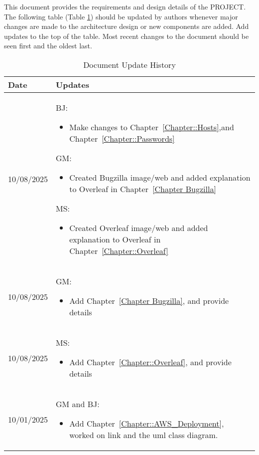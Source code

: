 This document provides the requirements and design details of the
PROJECT.  The following table (Table \ref{Table::UpdateHistory}) should be
updated by authors whenever major changes are made to the architecture
design or new components are added. Add updates to the top of the table.  
Most recent changes to the document should be seen first and the oldest 
last.

\begin{longtable}{|l||p{13.5cm}|}
\caption{Document Update History \label{Table::UpdateHistory}}\\
\hline
\textbf{Date} & \textbf{Updates} \\
\hline 
\endhead

10/08/2025 & BJ:
\begin{itemize}[topsep=0pt,itemsep=0pt,parsep=0pt,partopsep=0pt,leftmargin=12pt]
\item Make changes to Chapter~\ref{Chapter::Hosts},and Chapter~\ref{Chapter::Passwords} 
\end{itemize} 
GM:
\begin{itemize}[topsep=0pt,itemsep=0pt,parsep=0pt,partopsep=0pt,leftmargin=12pt]
\item Created Bugzilla image/web and added explanation to Overleaf in Chapter~\ref{Chapter Bugzilla}
\end{itemize} 
MS:
\begin{itemize}[topsep=0pt,itemsep=0pt,parsep=0pt,partopsep=0pt,leftmargin=12pt]
\item Created Overleaf image/web and added explanation to Overleaf in Chapter~\ref{Chapter::Overleaf}
\end{itemize} 
\\ \hline
10/08/2025 & GM:
\begin{itemize}[topsep=0pt,itemsep=0pt,parsep=0pt,partopsep=0pt,leftmargin=12pt]
\item Add Chapter~\ref{Chapter Bugzilla}, and provide details
\end{itemize} 
\\ \hline
10/08/2025 & MS:
\begin{itemize}[topsep=0pt,itemsep=0pt,parsep=0pt,partopsep=0pt,leftmargin=12pt]
\item Add Chapter~\ref{Chapter::Overleaf}, and provide details
\end{itemize} 
\\ \hline

10/01/2025 & GM and BJ:
\begin{itemize}[topsep=0pt,itemsep=0pt,parsep=0pt,partopsep=0pt,leftmargin=12pt]
\item Add Chapter~\ref{Chapter::AWS_Deployment}, worked on link and the uml class diagram. 
\end{itemize} 
\\ \hline


\end{longtable}
